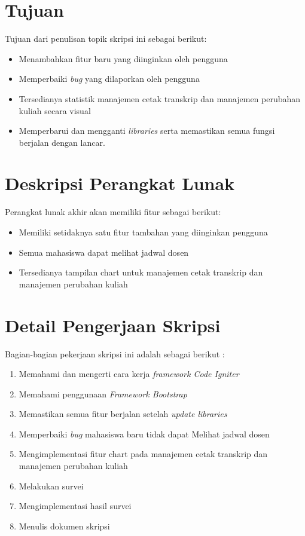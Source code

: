 \documentclass[a4paper,twoside]{article}
\begin{document}
\section{Tujuan}
Tujuan dari penulisan topik skripsi ini sebagai berikut:
\begin{itemize}
	\item Menambahkan fitur baru yang diinginkan oleh pengguna
	\item Memperbaiki \textit{bug} yang dilaporkan oleh pengguna
	\item Tersedianya statistik manajemen cetak transkrip dan manajemen perubahan kuliah secara visual
	\item Memperbarui dan mengganti \textit{libraries} serta memastikan semua fungsi berjalan dengan lancar.
\end{itemize}

\section{Deskripsi Perangkat Lunak}

Perangkat lunak akhir akan memiliki fitur sebagai berikut:
\begin{itemize}
	\item Memiliki setidaknya satu fitur tambahan yang diinginkan pengguna
	\item Semua mahasiswa dapat melihat jadwal dosen
	\item Tersedianya tampilan chart untuk manajemen cetak transkrip dan manajemen perubahan kuliah
	
\end{itemize}

\section{Detail Pengerjaan Skripsi}

Bagian-bagian pekerjaan skripsi ini adalah sebagai berikut :
	\begin{enumerate}
		\item Memahami dan mengerti cara kerja \textit{framework Code Igniter}
		\item Memahami penggunaan \textit{Framework Bootstrap}
		\item Memastikan semua fitur berjalan setelah \textit{update libraries} 
		\item Memperbaiki \textit{bug} mahasiswa baru tidak dapat Melihat jadwal dosen
		\item Mengimplementasi fitur chart pada manajemen cetak transkrip dan manajemen perubahan kuliah
		\item Melakukan survei
		\item Mengimplementasi hasil survei		
		\item Menulis dokumen skripsi
	\end{enumerate}
\end{document}
